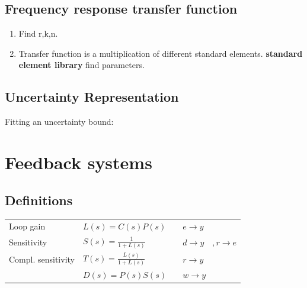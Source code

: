 \documentclass[10pt,a4paper]{scrartcl}
\begin{document}
\begin{multicols*}{3}
	\subsection{Frequency response \dahe transfer function}
	
	\begin{enumerate}
	\compaq
	\item
	Find r,k,n.
	\item
	Transfer function is a multiplication of different standard elements. \dahe \textbf{standard element library} \dahe find parameters.
	\end{enumerate}
	
	
	
	
	\subsection{Uncertainty Representation}
	
	
	Fitting an uncertainty bound:
	
	
	
	
	
	\section{Feedback systems}
	
	
	
	
	
	\subsection*{Definitions}
	
	\begin{tabular}{lll}
	Loop gain & $L(s)=C(s)P(s)\quad$&$ e\rightarrow y$\\
	Sensitivity & $S(s)=\frac{1}{1+L(s)}$&$ d\rightarrow y\quad, r\rightarrow e$\\
	Compl. sensitivity & $T(s)=\frac{L(s)}{1+L(s)}$&$r\rightarrow y$\\
	&$D(s)=P(s)S(s)$&$w\rightarrow y$
	\end{tabular}
	

\end{multicols*}
\end{document}
